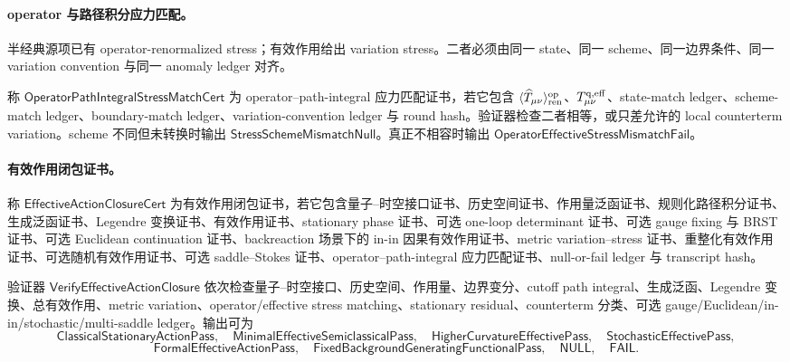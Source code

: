 \paragraph{operator 与路径积分应力匹配。}
半经典源项已有 operator-renormalized stress；有效作用给出 variation stress。二者必须由同一 state、同一 scheme、同一边界条件、同一 variation convention 与同一 anomaly ledger 对齐。

\begin{definition}\label{def:typed-address-biaxial-completion-operator-path-integral-stress-match-cert}
称 \(\mathsf{OperatorPathIntegralStressMatchCert}\) 为 operator--path-integral 应力匹配证书，若它包含 \(\langle\widehat T_{\mu\nu}\rangle_{\rm ren}^{\rm op}\)、\(T_{\mu\nu}^{\rm q,eff}\)、state-match ledger、scheme-match ledger、boundary-match ledger、variation-convention ledger 与 round hash。验证器检查二者相等，或只差允许的 local counterterm variation。scheme 不同但未转换时输出 \(\mathsf{StressSchemeMismatchNull}\)。真正不相容时输出 \(\mathsf{OperatorEffectiveStressMismatchFail}\)。
\end{definition}

\paragraph{有效作用闭包证书。}
\begin{definition}[有效作用闭包证书]\label{def:typed-address-biaxial-completion-effective-action-closure-cert}
称 \(\mathsf{EffectiveActionClosureCert}\) 为有效作用闭包证书，若它包含量子--时空接口证书、历史空间证书、作用量泛函证书、规则化路径积分证书、生成泛函证书、Legendre 变换证书、有效作用证书、stationary phase 证书、可选 one-loop determinant 证书、可选 gauge fixing 与 BRST 证书、可选 Euclidean continuation 证书、backreaction 场景下的 in-in 因果有效作用证书、metric variation--stress 证书、重整化有效作用证书、可选随机有效作用证书、可选 saddle--Stokes 证书、operator--path-integral 应力匹配证书、null-or-fail ledger 与 transcript hash。
\end{definition}

验证器 \(\mathsf{VerifyEffectiveActionClosure}\) 依次检查量子--时空接口、历史空间、作用量、边界变分、cutoff path integral、生成泛函、Legendre 变换、总有效作用、metric variation、operator/effective stress matching、stationary residual、counterterm 分类、可选 gauge/Euclidean/in-in/stochastic/multi-saddle ledger。输出可为
\[
\mathsf{ClassicalStationaryActionPass},\quad
\mathsf{MinimalEffectiveSemiclassicalPass},\quad
\mathsf{HigherCurvatureEffectivePass},\quad
\mathsf{StochasticEffectivePass},
\]
\[
\mathsf{FormalEffectiveActionPass},\quad
\mathsf{FixedBackgroundGeneratingFunctionalPass},\quad
\mathsf{NULL},\quad
\mathsf{FAIL}.
\]

